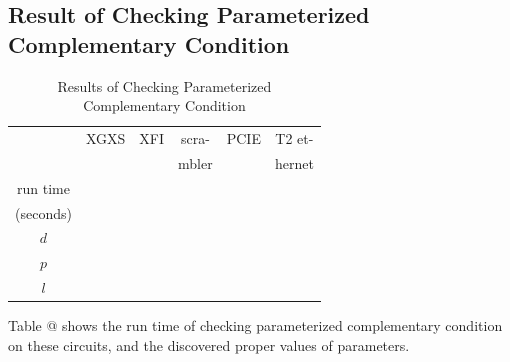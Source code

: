 \documentclass[journal]{IEEEtran}
\makeatletter
\newcommand{\Rmnum}[1]{\expandafter\@slowromancap\romannumeral #1@}
\makeatother
\begin{document}
\subsection{Result of Checking Parameterized Complementary Condition}
\begin{table}[!t]
\centering
\caption{Results of Checking Parameterized Complementary Condition}
\begin{tabular}{|c|c|c|c|c|c|}
\hline
&XGXS&XFI&scra-&PCIE&T2 et-\\
&&&mbler&&hernet\\ \hline
run time&&&&&\\
(seconds)&&&&&\\\hline
$d$      &       &     &         &   &          \\ \hline
$p$      &       &     &         &   &          \\ \hline
$l$      &       &     &         &   &          \\ \hline
\end{tabular}
\end{table}

Table \Rmnum{2} shows the run time of checking parameterized complementary condition on these circuits,
and the discovered proper values of parameters.
\end{document}
